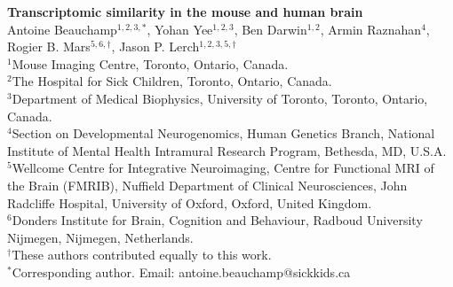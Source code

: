 
\LARGE{\textbf{Transcriptomic similarity in the mouse and human brain}}\\

\large
Antoine Beauchamp$^{1,2,3,*}$, Yohan Yee$^{1,2,3}$, Ben Darwin$^{1,2}$, Armin Raznahan$^{4}$, Rogier B. Mars$^{5,6,\dagger}$, Jason P. Lerch$^{1,2,3,5, \dagger}$\\


\small
$^1$Mouse Imaging Centre, Toronto, Ontario, Canada.\\
$^2$The Hospital for Sick Children, Toronto, Ontario, Canada.\\
$^3$Department of Medical Biophysics, University of Toronto, Toronto, Ontario, Canada.\\
$^4$Section on Developmental Neurogenomics, Human Genetics Branch, National Institute of Mental Health Intramural Research Program, Bethesda, MD, U.S.A.\\
$^5$Wellcome Centre for Integrative Neuroimaging, Centre for Functional MRI of the Brain (FMRIB), Nuffield Department of Clinical Neurosciences, John Radcliffe Hospital, University of Oxford, Oxford, United Kingdom.\\
$^6$Donders Institute for Brain, Cognition and Behaviour, Radboud University Nijmegen, Nijmegen, Netherlands.\\
$^{\dagger}$These authors contributed equally to this work.\\
$^{*}$Corresponding author. Email: antoine.beauchamp@sickkids.ca


\normalsize
{}